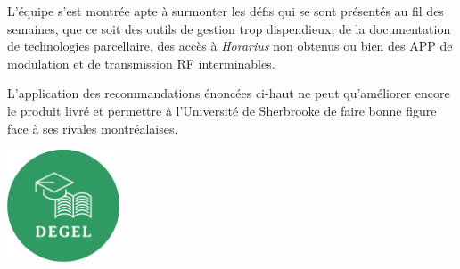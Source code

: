 L'équipe s'est montrée apte à surmonter les défis qui se sont présentés au fil des semaines, que ce soit des outils de gestion trop dispendieux, de la documentation de technologies parcellaire, des accès à \emph{Horarius} non obtenus ou bien des APP de modulation et de transmission RF interminables.

L'application des recommandations énoncées ci-haut ne peut qu'améliorer encore le produit livré et permettre à l'Université de Sherbrooke de faire bonne figure face à ses rivales montréalaises.



\vfill

{%
\centering%
\includegraphics[width=0.25\textwidth]{Figures/logo}%
\par%
}

\vfill
